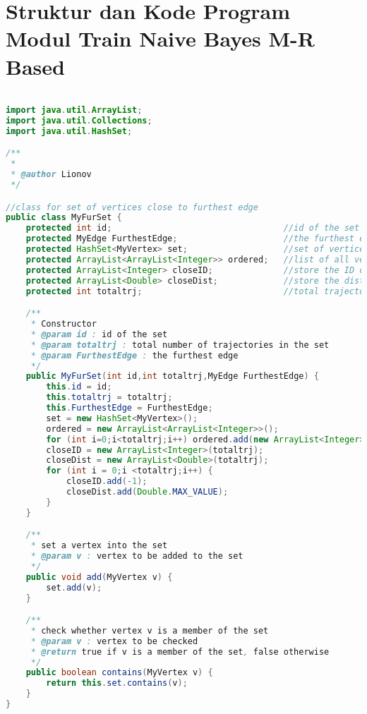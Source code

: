 \chapter{Struktur dan Kode Program Modul Train Naive Bayes M-R Based}
\label{lamp:A}

\singlespacing 
%
%
\begin{lstlisting}[language=Java,basicstyle=\tiny,caption=MyFurSet.java]

import java.util.ArrayList;
import java.util.Collections;
import java.util.HashSet; 

/**
 *
 * @author Lionov
 */

//class for set of vertices close to furthest edge
public class MyFurSet {
    protected int id;                                  //id of the set
    protected MyEdge FurthestEdge;                     //the furthest edge
    protected HashSet<MyVertex> set;                   //set of vertices close to furthest edge
    protected ArrayList<ArrayList<Integer>> ordered;   //list of all vertices in the set for each trajectory
    protected ArrayList<Integer> closeID;              //store the ID of all vertices
    protected ArrayList<Double> closeDist;             //store the distance of all vertices
    protected int totaltrj;                            //total trajectories in the set

    /**
     * Constructor
     * @param id : id of the set
     * @param totaltrj : total number of trajectories in the set
     * @param FurthestEdge : the furthest edge
     */
    public MyFurSet(int id,int totaltrj,MyEdge FurthestEdge) {
        this.id = id;
        this.totaltrj = totaltrj;
        this.FurthestEdge = FurthestEdge;
        set = new HashSet<MyVertex>();
        ordered = new ArrayList<ArrayList<Integer>>();
        for (int i=0;i<totaltrj;i++) ordered.add(new ArrayList<Integer>());
        closeID = new ArrayList<Integer>(totaltrj);
        closeDist = new ArrayList<Double>(totaltrj);
        for (int i = 0;i <totaltrj;i++) {
            closeID.add(-1);
            closeDist.add(Double.MAX_VALUE);
        }
    }

    /**
     * set a vertex into the set
     * @param v : vertex to be added to the set
     */
    public void add(MyVertex v) {
        set.add(v);
    }

    /**
     * check whether vertex v is a member of the set
     * @param v : vertex to be checked
     * @return true if v is a member of the set, false otherwise
     */
    public boolean contains(MyVertex v) {
        return this.set.contains(v);
    }
}
\end{lstlisting}

